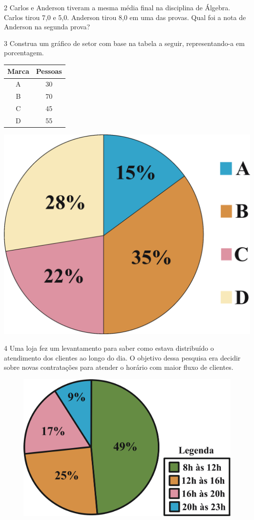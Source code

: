 \num{2} Carlos e Anderson tiveram a mesma média final na disciplina de Álgebra.
Carlos tirou 7,0 e 5,0. Anderson tirou 8,0 em uma das provas. Qual foi a nota 
de Anderson na segunda prova?



\num{3} Construa um gráfico de setor com base na tabela a seguir,
representando-a em porcentagem.

\begin{center}
\begin{tabular}{|c|c|}
\hline
\textbf{Marca} & \textbf{Pessoas} \\ \hline
A & 30 \\ \hline
B & 70 \\ \hline
C & 45 \\ \hline
D & 55 \\ \hline
\end{tabular}
\end{center}

\begin{emptybox}
\includegraphics[width=.6\textwidth]{./ilustras-mat/modulo_13-atividade_3_resposta.png}
\end{emptybox}

\num{4} Uma loja fez um levantamento para saber como estava distribuído o
atendimento dos clientes ao longo do dia. O objetivo dessa pesquisa era decidir
sobre novas contratações para atender o horário com maior fluxo de clientes.

\begin{figure}[htpb!]
\centering
\includegraphics[width=.6\textwidth]{./ilustras-mat/modulo_13-atividade_4.png}
\end{figure}

